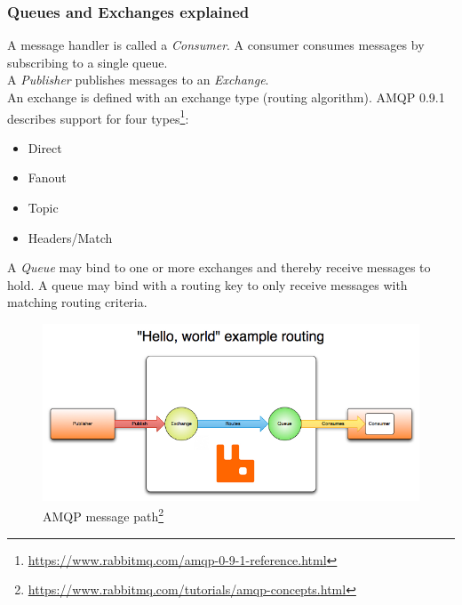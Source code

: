 \subsubsection{Queues and Exchanges explained}
A message handler is called a \textit{Consumer}. A consumer consumes messages by subscribing to a single queue.\\
A \textit{Publisher} publishes messages to an \textit{Exchange}.\\
An exchange is defined with an exchange type (routing algorithm). AMQP 0.9.1 describes support for four types\footnote{\url{https://www.rabbitmq.com/amqp-0-9-1-reference.html}}:
\begin{itemize}
\item Direct
\item Fanout
\item Topic
\item Headers/Match
\end{itemize}
A \textit{Queue} may bind to one or more exchanges and thereby receive messages to hold. A queue may bind with a routing key to only receive messages with matching routing criteria.
\begin{figure}[H]
  \includegraphics[width=\textwidth]{illustrations/publisher-exchange-queue-consumer.png}
  \caption{AMQP message path\footnote{\url{https://www.rabbitmq.com/tutorials/amqp-concepts.html}}}
\end{figure}
\newpage